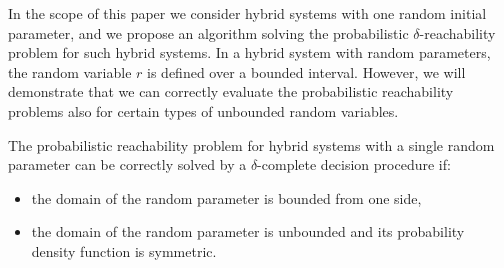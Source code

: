 In the scope of this paper we consider hybrid systems with one random initial parameter, and 
we propose an algorithm solving the probabilistic $\delta$-reachability problem for such 
hybrid systems. In a hybrid system with random parameters, the random variable $r$ is defined 
over a bounded interval. However, we will demonstrate that we can correctly evaluate the 
probabilistic reachability problems also for certain types of unbounded random variables.

\begin{proposition} \label{prop:inf}
The probabilistic reachability problem for hybrid systems with a single random parameter 
can be correctly solved by a $\delta$-complete decision procedure if:
\begin{itemize}
	\item the domain of the random parameter is bounded from one side,
	\item the domain of the random parameter is unbounded and its probability density 
		function is symmetric.
\end{itemize}
\end{proposition}
